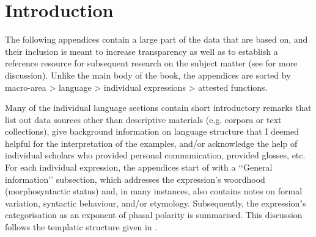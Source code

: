 \appendix
{}

\togglefalse{autoexewidth}
\nogltOffset 

\chapter{Introduction}\label{Appendix}
The following appendices contain a large part of the data that  are based on, and their inclusion is meant to increase transparency as well as to establish a reference resource for subsequent research on the subject matter (see  for more discussion). Unlike the main body of the book, the appendices are sorted by macro-area > language > individual expressions > attested functions.

Many of the individual language sections contain short introductory remarks that list out data sources other than descriptive materials (e.g. corpora or text collections), give background information on language structure that I deemed helpful for the interpretation of the examples, and/or acknowledge the help of individual scholars who provided personal communication, provided glosses, etc. For each individual expression, the appendices start of with a \lq\lq General information\rq\rq{ }subsection, which addresses the expression's woordhood (morphosyntactic status) and, in many instances, also contains notes on formal variation, syntactic behaviour, and/or etymology. Subsequently, the expressionʼs categorisation as an exponent of phasal polarity is summarised. This discussion follows the templatic structure given in .\largerpage[3]

